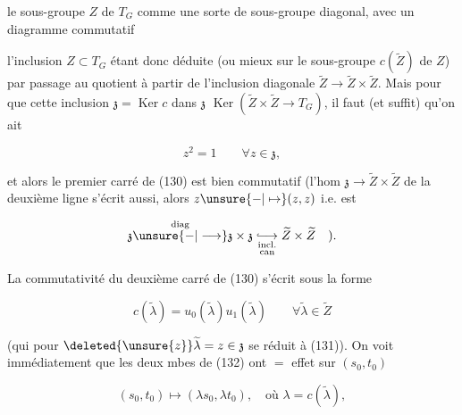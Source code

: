 
le sous-groupe $Z$ de $T_G$ comme une sorte de sous-groupe diagonal, avec un diagramme commutatif



 

l'inclusion $Z\subset T_G$ étant donc déduite (ou mieux sur le sous-groupe $c(\widetilde Z)$ de $Z$) par passage au quotient à partir de l'inclusion diagonale $\widetilde Z\longrightarrow\widetilde Z\times\widetilde Z$. Mais pour que cette inclusion   $\mathfrak{z}=\operatorname{Ker} c$ dans $\mathfrak{z}$  $\operatorname{Ker}(\widetilde Z\times\widetilde Z\longrightarrow T_G)$, il faut (et suffit) qu'on ait

\[z^2=1\qquad\forall z\in\mathfrak{z},\tag*{(131)}\]

et alors le premier carré de (130) est bien commutatif (l'hom $\mathfrak{z}\longrightarrow\widetilde Z\times\widetilde Z$ de la deuxième ligne  s'écrit aussi, alors $z\unsure{-|\mapsto}(z,z)$ i.e. est  

\[\mathfrak{z}\overset{\mathrm{diag}}{\unsure{-|\longrightarrow}}\mathfrak{z}\times\mathfrak{z}
\underset{\substack{\mathrm{incl}.\\\mathrm{can}}}{\lhook\joinrel\longrightarrow}
\widetilde Z\times\widetilde Z\quad).\]

La commutativité du deuxième carré de (130) s'écrit sous la forme

\[c(\widetilde\lambda)=u_0(\widetilde\lambda)u_1(\widetilde\lambda)\qquad\forall\widetilde\lambda\in\widetilde Z\tag*{(132)}\]

(qui  pour $\deleted{\unsure{z}}\widetilde\lambda=z\in\mathfrak{z}$ se réduit à (131)). On voit immédiatement que les deux mbes de (132)  ont $=$ effet sur $(s_0,t_0)$

\[(s_0,t_0)\longmapsto(\lambda s_0,\lambda t_0),\quad\text{où }\lambda=c(\widetilde\lambda),\]

